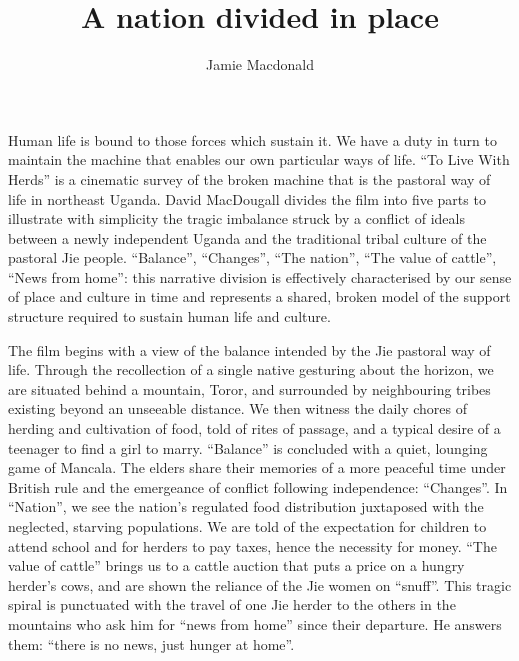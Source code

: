 \documentclass[12pt, letterpaper, oneside]{article}
\title{A nation divided in place}
\author{Jamie Macdonald}
\begin{document}
\maketitle
Human life is bound to those forces which sustain it. We have a duty in turn to maintain the machine that enables our own particular ways of life. ``To Live With Herds'' \autocite{macdougall1972live} is a cinematic survey of the broken machine that is the pastoral way of life in northeast Uganda. David MacDougall divides the film into five parts to illustrate with simplicity the tragic imbalance struck by a conflict of ideals between a newly independent Uganda and the traditional tribal culture of the pastoral Jie people. ``Balance'', ``Changes'', ``The nation'', ``The value of cattle'', ``News from home'': this narrative division is effectively characterised by our sense of place and culture in time and represents a shared, broken model of the support structure required to sustain human life and culture.

The film begins with a view of the balance intended by the Jie pastoral way of life. Through the recollection of a single native gesturing about the horizon, we are situated behind a mountain, Toror, and surrounded by neighbouring tribes existing beyond an unseeable distance. We then witness the daily chores of herding and cultivation of food, told of rites of passage, and a typical desire of a teenager to find a girl to marry. ``Balance'' is concluded with a quiet, lounging game of Mancala. The elders share their memories of a more peaceful time under British rule and the emergeance of conflict following independence: ``Changes''. In ``Nation'', we see the nation's regulated food distribution juxtaposed with the neglected, starving populations. We are told of the expectation for children to attend school and for herders to pay taxes, hence the necessity for money. ``The value of cattle'' brings us to a cattle auction that puts a price on a hungry herder's cows, and are shown the reliance of the Jie women on ``snuff''. This tragic spiral is punctuated with the travel of one Jie herder to the others in the mountains who ask him for ``news from home'' since their departure. He answers them: ``there is no news, just hunger at home''.
\end{document}
